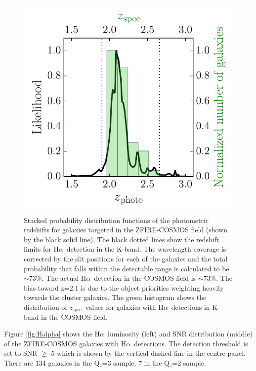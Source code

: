 \documentclass[iop]{emulateapj}
\newcommand{\Halpha}{H$\alpha$}
\newcommand{\around}{$\sim$}
\newcommand{\zspec}{$z_{\mathrm{spec}}$}
\begin{document}
\begin{figure}[h!]
\includegraphics[trim = 10 0 5 5, clip, scale=0.9]{figures/pz.pdf}
\caption{Stacked probability distribution functions of the photometric redshifts for galaxies targeted in the ZFIRE-COSMOS field (shown by the black solid line). 
The black dotted lines show the redshift limits for \Halpha\ detection in the K-band. 
The wavelength coverage is corrected by the slit positions for each of the galaxies and the total probability that falls within the detectable range is calculated to be \around73\%. 
The actual \Halpha\ detection in the COSMOS field is \around73\%.
The bias toward z=2.1 is due to the object priorities weighting heavily towards the cluster galaxies. 
The green histogram shows the distribution of \zspec\ values for galaxies with \Halpha\ detections in K-band in the COSMOS field. 
}
\label{fig:completeness}
\end{figure}



Figure \ref{fig:Halpha} shows the \Halpha\ luminosity (left) and SNR distribution (middle) of the ZFIRE-COSMOS galaxies with \Halpha\ detections. 
The detection threshold is set to SNR $\geq$ 5 which is shown by the vertical dashed line in the centre panel. There are 134 galaxies in the Q$_{z}$=3 sample, 7 in the Q$_{z}$=2 sample. 
\end{document}
